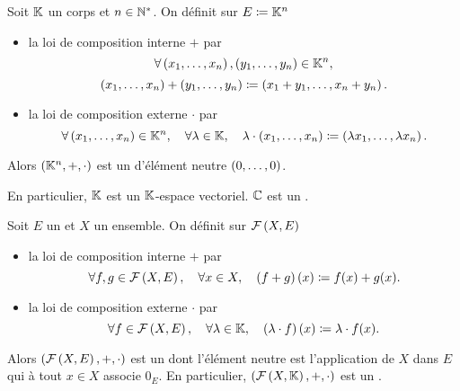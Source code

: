 \documentclass{magnoliaold}
\begin{document}
\begin{definition}[utile=-3]
Soit $\mathbb{K}$ un corps et $n\in{\mathbb{N}^*}$. On définit sur $E\coloneqq\mathbb{K}^n$
\begin{itemize}
\item la loi de composition interne $+$ par
  \[\forall \left(x_1,\ldots,x_n\right),\left(y_1,\ldots,y_n\right)\in\mathbb{K}^n,\]
  \[\left(x_1,\ldots,x_n\right)+\left(y_1,\ldots,y_n\right)\coloneqq\left(x_1+y_1,\ldots,x_n+y_n\right).\]
\item la loi de composition externe $\cdot$ par
  \[\forall \left(x_1,\ldots,x_n\right)\in\mathbb{K}^n ,\quad \forall \lambda\in\mathbb{K} ,\quad
    \lambda\cdot\left(x_1,\ldots,x_n\right)\coloneqq\left(\lambda x_1,\ldots,\lambda x_n\right).\]
\end{itemize}
Alors $\left(\mathbb{K}^n,+,\cdot\right)$ est un \Kev d'élément neutre $\left(0,\ldots,0\right)$.
\end{definition}

\begin{remarques}
\remarque[utile=-1] En particulier, $\mathbb{K}$ est un $\mathbb{K}$-espace vectoriel.
\remarque $\mathbb{C}$ est un \Rev.
\end{remarques}


\begin{definition}[utile=-3]
Soit $E$ un \Kev et $X$ un ensemble. On définit sur
$\mathcal{F}\left(X,E\right)$
\begin{itemize}
\item la loi de composition interne $+$ par
  \[\forall f,g\in\mathcal{F}\left(X,E\right) ,\quad \forall x\in X ,\quad
    \left(f+g\right)(x)\coloneqq f(x)+g(x).\]
\item la loi de composition externe $\cdot$ par
  \[\forall f\in\mathcal{F}\left(X,E\right) ,\quad \forall \lambda\in\mathbb{K} ,\quad
    \left(\lambda\cdot f\right)(x)\coloneqq\lambda \cdot f(x).\]
\end{itemize}
Alors $\left(\mathcal{F}\left(X,E\right),+,\cdot\right)$ est un \Kev dont l'élément neutre est
l'application de $X$ dans $E$ qui à tout $x\in X$ associe $0_E$. En particulier,
$\left(\mathcal{F}\left(X,\mathbb{K}\right),+,\cdot\right)$ est un \Kev.
\end{definition}
\end{document}

